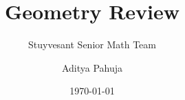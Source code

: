 \documentclass{scrartcl}
\title{Geometry Review}
\subtitle{Stuyvesant Senior Math Team}
\author{Aditya Pahuja}
\date{\today}
\begin{document}
	\maketitle
	\tableofcontents
	\pagebreak
\end{document}
